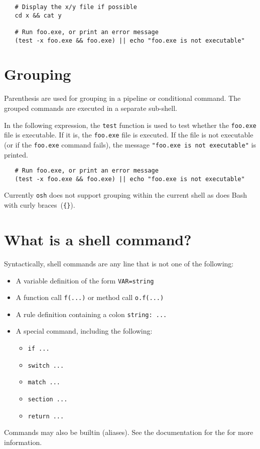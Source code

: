 \begin{verbatim}
   # Display the x/y file if possible
   cd x && cat y

   # Run foo.exe, or print an error message
   (test -x foo.exe && foo.exe) || echo "foo.exe is not executable"
\end{verbatim}

\section{Grouping}

Parenthesis are used for grouping in a pipeline or conditional command.  The grouped commands are
executed in a separate sub-shell.

In the following expression, the \verb+test+ function is used to test whether the \verb+foo.exe+
file is executable.  If it is, the \verb+foo.exe+ file is executed.  If the file is not executable
(or if the \verb+foo.exe+ command fails), the message \verb+"foo.exe is not executable"+ is printed.

\begin{verbatim}
   # Run foo.exe, or print an error message
   (test -x foo.exe && foo.exe) || echo "foo.exe is not executable"
\end{verbatim}

Currently \verb+osh+ does not support grouping within the current shell as does Bash with curly
braces~(\verb+{}+).

\section{What is a shell command?}

Syntactically, shell commands are any line that is not one of the following:

\begin{itemize}
\item A variable definition of the form \verb+VAR=string+
\item A function call \verb+f(...)+ or method call \verb+o.f(...)+
\item A rule definition containing a colon \verb+string: ...+
\item A special command, including the following:
\begin{itemize}
\item \verb+if ...+
\item \verb+switch ...+
\item \verb+match ...+
\item \verb+section ...+
\item \verb+return ...+
\end{itemize}
\end{itemize}

Commands may also be builtin (aliases).  See the documentation for the
 for more information.

